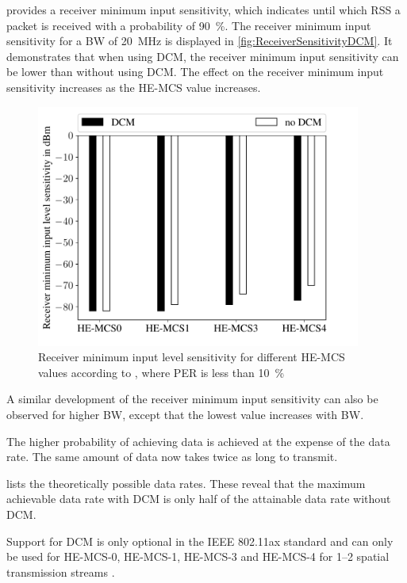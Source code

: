 \cite{noauthor_ieee_2021} provides a receiver minimum input sensitivity, which indicates until which RSS a packet is
received with a probability of \SI{90}{\percent}.
The receiver minimum input sensitivity for a \ac{BW} of
\SI{20}{\mega\hertz} is displayed in \autoref{fig:ReceiverSensitivityDCM}.
It demonstrates that when using \ac{DCM},
the receiver minimum input sensitivity can be lower than without using \ac{DCM}. The effect on the receiver minimum
input sensitivity increases as the HE-MCS value increases.
\begin{figure}%
	\centering
	\includegraphics[width=0.95\textwidth]{figures/Receiver_minimum_DCM}
	\caption{Receiver minimum input level sensitivity for different HE-MCS values according to \cite{noauthor_ieee_2021}, where \ac{PER} is less than \SI{10}{\percent}}%
	\label{fig:ReceiverSensitivityDCM}%
\end{figure}

A similar development of the receiver minimum input sensitivity can also be observed for higher \ac{BW}, except
that the lowest value increases with \ac{BW}.

The higher probability of achieving data is achieved at the expense of the data rate.
The same amount of data now takes twice as long to transmit.

\cite{noauthor_ieee_2021} lists the theoretically possible data rates.
These reveal that the maximum achievable data rate with DCM is only half of the attainable data rate without DCM.

Support for \ac{DCM} is only optional in the IEEE 802.11ax standard and can only be used for HE-\ac{MCS}-\num{0},
HE-\ac{MCS}-\num{1}, HE-\ac{MCS}-\num{3} and HE-\ac{MCS}-\num{4} for \numrange{1}{2} spatial
transmission streams \cite{noauthor_ieee_2021}.

